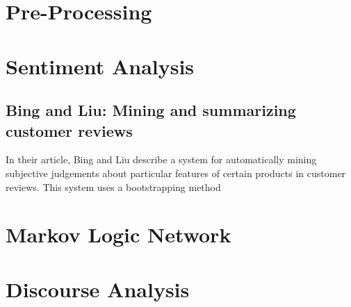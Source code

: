 \documentclass[a4paper,11pt]{article}
\begin{document}
\section{Pre-Processing}

\section{Sentiment Analysis}
\subsection{Bing and Liu: Mining and summarizing customer reviews\cite{Bing-Liu-04}}
In their article, Bing and Liu describe a system for automatically mining
subjective judgements about particular features of certain products in
customer reviews.  This system uses a bootstrapping method

\section{Markov Logic Network}

\section{Discourse Analysis}

\nocite{*}

\end{document}

